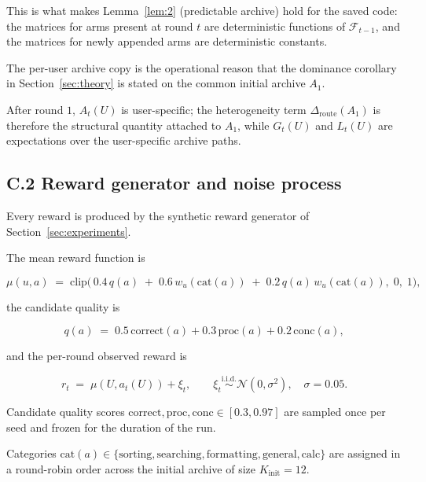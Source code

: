 \documentclass{article} %
\begin{document}
This is what makes Lemma~\ref{lem:2} (predictable archive) hold for the saved code: the matrices for arms present at round $t$ are deterministic functions of $\mathcal{F}_{t-1}$, and the matrices for newly appended arms are deterministic constants.

The per-user archive copy is the operational reason that the dominance corollary in Section~\ref{sec:theory} is stated on the common initial archive $A_1$.

After round $1$, $A_t(U)$ is user-specific; the heterogeneity term $\Delta_{\mathrm{route}}(A_1)$ is therefore the structural quantity attached to $A_1$, while $G_t(U)$ and $L_t(U)$ are expectations over the user-specific archive paths.

\subsection{C.2 Reward generator and noise process}

\label{app:impl-reward}

Every reward is produced by the synthetic reward generator of Section~\ref{sec:experiments}.

The mean reward function is

\begin{equation}
\label{eq:app-impl-mean}
\mu(u, a) \;=\; \mathrm{clip}\big(\, 0.4\, q(a) \;+\; 0.6\, w_u(\mathrm{cat}(a)) \;+\; 0.2\, q(a)\, w_u(\mathrm{cat}(a)),\; 0,\; 1 \big),
\end{equation}

the candidate quality is

\begin{equation}
\label{eq:app-impl-q}
q(a) \;=\; 0.5\,\mathrm{correct}(a) + 0.3\,\mathrm{proc}(a) + 0.2\,\mathrm{conc}(a),
\end{equation}

and the per-round observed reward is

\begin{equation}
\label{eq:app-impl-r}
r_t \;=\; \mu(U, a_t(U)) + \xi_t, \qquad \xi_t \overset{\text{i.i.d.}}{\sim} \mathcal{N}(0, \sigma^2), \quad \sigma = 0.05.
\end{equation}

Candidate quality scores $\mathrm{correct}, \mathrm{proc}, \mathrm{conc} \in [0.3, 0.97]$ are sampled once per seed and frozen for the duration of the run.

Categories $\mathrm{cat}(a) \in \{\text{sorting}, \text{searching}, \text{formatting}, \text{general}, \text{calc}\}$ are assigned in a round-robin order across the initial archive of size $K_{\text{init}} = 12$.
\end{document}
